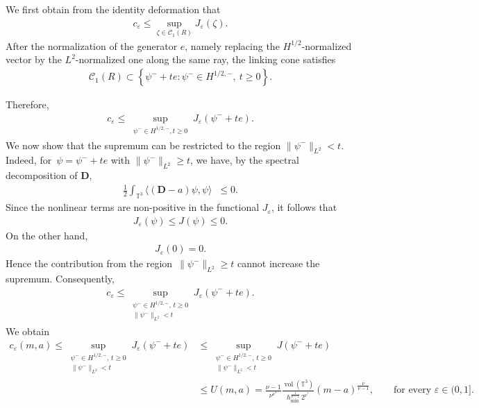 \documentclass[11pt,final]{amsart}
\newcommand{\T}{\mathbb{T}}
\newcommand{\dd}{\mathop{}\!\mathrm{d}}
\newcommand{\eps}{\varepsilon}
\newcommand{\pD}{\mathbf{D}}
\DeclareMathOperator{\dv}{\dd{vol}}
\begin{document}
We first obtain from the identity deformation that
\begin{align}
c_\eps
\leq
\sup_{\zeta\in\mathscr C_1(R)}
J_\eps(\zeta).
\end{align}
After the normalization of the generator $e$, namely replacing the $H^{1/2}$-normalized vector by the $L^2$-normalized one along the same ray, the linking cone satisfies
\begin{align}
\mathscr C_1(R)
\subset
\left\{
\psi^-+te:
\psi^-\in H^{1/2,-},\ t\geq0
\right\}.
\end{align}

Therefore,
\begin{align}
c_\eps
\leq
\sup_{\substack{
\psi^-\in H^{1/2,-},t\geq0
}}
J_\eps(\psi^-+te).
\end{align}
We now show that the supremum can be restricted to the region
$\|\psi^-\|_{L^2}<t$. Indeed, for~$\psi=\psi^-+te$ with $\|\psi^-\|_{L^2}\geq t$, we have, by the spectral decomposition of $\pD$,
\begin{align}
\frac12\int_{\T^3}
\langle
(\pD-a)\psi,\psi
\rangle\dv
\leq0 .
\end{align}
Since the nonlinear terms are non-positive in the functional $J_\eps$, it follows that
\begin{align}
J_\eps(\psi)
\leq
J(\psi)
\leq0 .
\end{align}
On the other hand, 
\begin{align}
J_\eps(0)=0.
\end{align}
Hence the contribution from the region~$\|\psi^-\|_{L^2}\geq t$ cannot increase the supremum. Consequently,
\begin{align}
c_\eps
\leq
\sup_{\substack{\psi^-\in H^{1/2,-},\,t\ge0\\
\|\psi^-\|_{L^2}<t}}
J_\eps(\psi^-+te).
\end{align}
We obtain
\begin{align}\label{eq:uniform estimate for perturbation}
c_\eps(m,a)
\leq
\sup_{\substack{\psi^-\in H^{1/2,-},\,t\ge0\\
\|\psi^-\|_{L^2}<t}}
J_\eps(\psi^-+te)
&\leq
\sup_{\substack{\psi^-\in H^{1/2,-},\,t\ge0\\
\|\psi^-\|_{L^2}<t}}
J(\psi^-+te)\\
&\leq U(m,a)=
\frac{\nu-1}{\nu^{\nu^*}}
\frac{\operatorname{vol}(\mathbb T^3)}
{h_{\min}^{\frac1{\nu-1}}\,2^{\nu^*}}
(m-a)^{\frac{\nu}{\nu-1}},
\qquad\text{for every }\eps\in(0,1].
\end{align}
\end{document}
